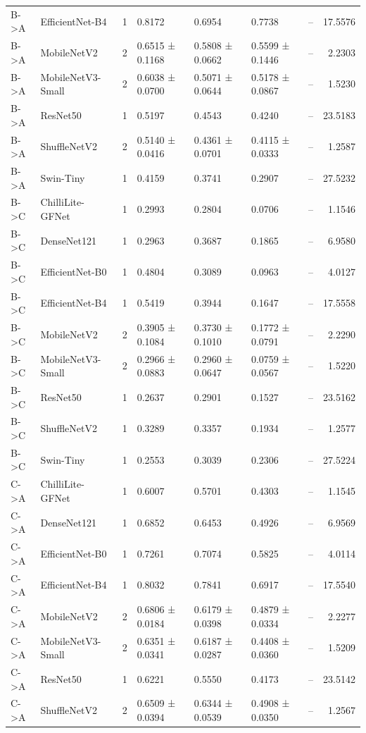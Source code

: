 \begin{tabular}{llrllllr}
B->A & EfficientNet-B4 & 1 & 0.8172 & 0.6954 & 0.7738 & -- & 17.5576 \\
B->A & MobileNetV2 & 2 & 0.6515 ± 0.1168 & 0.5808 ± 0.0662 & 0.5599 ± 0.1446 & -- & 2.2303 \\
B->A & MobileNetV3-Small & 2 & 0.6038 ± 0.0700 & 0.5071 ± 0.0644 & 0.5178 ± 0.0867 & -- & 1.5230 \\
B->A & ResNet50 & 1 & 0.5197 & 0.4543 & 0.4240 & -- & 23.5183 \\
B->A & ShuffleNetV2 & 2 & 0.5140 ± 0.0416 & 0.4361 ± 0.0701 & 0.4115 ± 0.0333 & -- & 1.2587 \\
B->A & Swin-Tiny & 1 & 0.4159 & 0.3741 & 0.2907 & -- & 27.5232 \\
B->C & ChilliLite-GFNet & 1 & 0.2993 & 0.2804 & 0.0706 & -- & 1.1546 \\
B->C & DenseNet121 & 1 & 0.2963 & 0.3687 & 0.1865 & -- & 6.9580 \\
B->C & EfficientNet-B0 & 1 & 0.4804 & 0.3089 & 0.0963 & -- & 4.0127 \\
B->C & EfficientNet-B4 & 1 & 0.5419 & 0.3944 & 0.1647 & -- & 17.5558 \\
B->C & MobileNetV2 & 2 & 0.3905 ± 0.1084 & 0.3730 ± 0.1010 & 0.1772 ± 0.0791 & -- & 2.2290 \\
B->C & MobileNetV3-Small & 2 & 0.2966 ± 0.0883 & 0.2960 ± 0.0647 & 0.0759 ± 0.0567 & -- & 1.5220 \\
B->C & ResNet50 & 1 & 0.2637 & 0.2901 & 0.1527 & -- & 23.5162 \\
B->C & ShuffleNetV2 & 1 & 0.3289 & 0.3357 & 0.1934 & -- & 1.2577 \\
B->C & Swin-Tiny & 1 & 0.2553 & 0.3039 & 0.2306 & -- & 27.5224 \\
C->A & ChilliLite-GFNet & 1 & 0.6007 & 0.5701 & 0.4303 & -- & 1.1545 \\
C->A & DenseNet121 & 1 & 0.6852 & 0.6453 & 0.4926 & -- & 6.9569 \\
C->A & EfficientNet-B0 & 1 & 0.7261 & 0.7074 & 0.5825 & -- & 4.0114 \\
C->A & EfficientNet-B4 & 1 & 0.8032 & 0.7841 & 0.6917 & -- & 17.5540 \\
C->A & MobileNetV2 & 2 & 0.6806 ± 0.0184 & 0.6179 ± 0.0398 & 0.4879 ± 0.0334 & -- & 2.2277 \\
C->A & MobileNetV3-Small & 2 & 0.6351 ± 0.0341 & 0.6187 ± 0.0287 & 0.4408 ± 0.0360 & -- & 1.5209 \\
C->A & ResNet50 & 1 & 0.6221 & 0.5550 & 0.4173 & -- & 23.5142 \\
C->A & ShuffleNetV2 & 2 & 0.6509 ± 0.0394 & 0.6344 ± 0.0539 & 0.4908 ± 0.0350 & -- & 1.2567 \\

\end{tabular}

